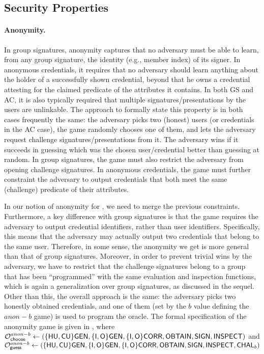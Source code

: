 \subsection{Security Properties}
\label{ssec:security}

\paragraph{Anonymity.} %
In group signatures, anonymity captures that no adversary must be able to learn,
from any group signature, the identity (e.g., member index) of its signer. In 
anonymous credentials, it requires that no adversary should learn anything about
the holder of a successfully shown credential, beyond that he owns a credential
attesting for the claimed predicate of the attributes it contains. In both GS
and AC, it is also typically required that
multiple signatures/presentations by the users are unlinkable. The approach to
formally state this property is in both cases frequently the same: the adversary
picks two (honest) users (or credentials in the AC case), the game randomly
chooses one of them, and lets the adversary request challenge
signatures/presentations from it. The adversary wins if it succeeds in guessing
which was the chosen user/credential better than guessing at random. In group
signatures, the game must also restrict the adversary from opening challenge
signatures. In anonymous credentials, the game must further constraint the
adversary to output credentials that both meet the same (challenge) predicate
of their attributes.

In our notion of anonymity for \UAS, we need to merge the previous constraints.
Furthermore, a key difference with group signatures is that the game requires
the adversary to output credential identifiers, rather than user identifiers.
Specifically, this means that the adversary may actually output two credentials
that belong to the same user. Therefore, in some sense, the anonymity we get is
more general than that of group signatures. Moreover, in order to prevent
trivial wins by the adversary, we have to restrict that the challenge signatures
belong to a group that has been ``programmed'' with the same evaluation and
inspection functions, which is again a generalization over group signatures,
as discussed in the sequel. Other than this, the overall approach is the same:
the adversary picks two honestly obtained credentials, and one of them (set
by the $b$ value defining the $anon-b$ game) is used to program the \CHALb
oracle. The formal specification of the anonymity game is
given in , where $\mathcal{O}^{anon-b}_{\mathsf{choose}} \gets (\lbrace\mathsf{HU},\mathsf{CU}\rbrace
\mathsf{GEN},\lbrace\mathsf{I},\mathsf{O}\rbrace\mathsf{GEN},\lbrace\mathsf{I},\mathsf{O}\rbrace\mathsf{CORR},\mathsf{OBTAIN},\mathsf{SIGN},
\mathsf{INSPECT})$ and $\mathcal{O}^{anon-b}_{\mathsf{guess}} \gets (\lbrace\mathsf{HU},\mathsf{CU}\rbrace\mathsf{GEN},\lbrace\mathsf{I},\mathsf{O}\rbrace
\mathsf{GEN},\lbrace\mathsf{I},\mathsf{O}\rbrace\mathsf{CORR},\mathsf{OBTAIN},\mathsf{SIGN},\mathsf{INSPECT},\mathsf{CHAL}_b)$

